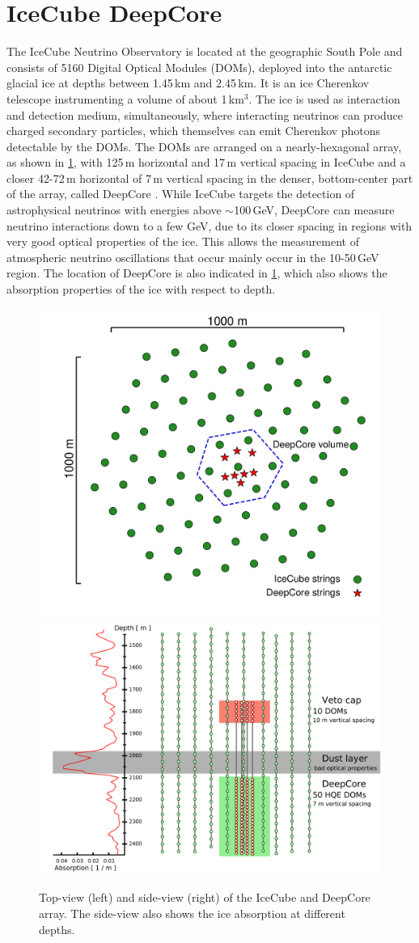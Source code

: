 \documentclass[a4paper,11pt]{article}
\begin{document}
\section{IceCube DeepCore}

The IceCube Neutrino Observatory \cite{Aartsen:2016nxy} is located at the geographic South Pole and consists of 5160 Digital Optical Modules (DOMs), deployed into the antarctic glacial ice at depths between 1.45\,km and 2.45\,km. It is an ice Cherenkov telescope instrumenting a volume of about 1\,km$^{3}$. The ice is used as interaction and detection medium, simultaneously, where interacting neutrinos can produce charged secondary particles, which themselves can emit Cherenkov photons detectable by the DOMs. The DOMs are arranged on a nearly-hexagonal array, as shown in \cref{fig:icecube_array}, with 125\,m horizontal and 17\,m vertical spacing in IceCube and a closer 42-72\,m horizontal of 7\,m vertical spacing in the denser, bottom-center part of the array, called DeepCore \cite{IceCube:2011ucd}. While IceCube targets the detection of astrophysical neutrinos with energies above $\sim$100\,GeV, DeepCore can measure neutrino interactions down to a few GeV, due to its closer spacing in regions with very good optical properties of the ice. This allows the measurement of atmospheric neutrino oscillations that occur mainly occur in the 10-50\,GeV region. The location of DeepCore is also indicated in \cref{fig:icecube_array}, which also shows the absorption properties of the ice with respect to depth.

\begin{figure}[h]
  \includegraphics[width=.43\linewidth]{figures/icecube_top_view_bw.pdf}
  \includegraphics[width=.52\linewidth]{figures/DeepCore_sideview.png}
  \caption{Top-view (left) and side-view (right) of the IceCube and DeepCore array. The side-view also shows the ice absorption at different depths.}
  \label{fig:icecube_array}
\end{figure}
\end{document}
